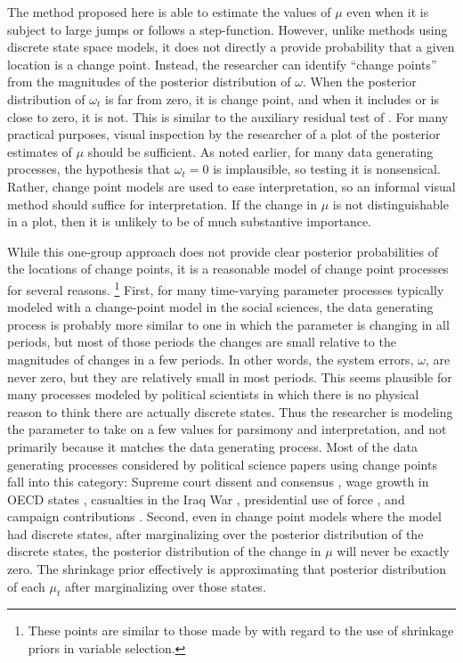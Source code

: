 The method proposed here is able to estimate the values of $\mu$ even when it is subject to large jumps or follows a step-function. 
However, unlike methods using discrete state space models, it does not directly a provide probability that a given location is a change point.
Instead, the researcher can identify ``change points'' from the magnitudes of the posterior distribution of $\omega$.
When the posterior distribution of $\omega_{t}$ is far from zero, it is change point, and when it includes or is close to zero, it is not.
This is similar to the auxiliary residual test of \textcite{DeJongPenzer1998}.
For many practical purposes, visual inspection by the researcher of a plot of the posterior estimates of $\mu$ should be sufficient.
As noted earlier, for many data generating processes, the hypothesis that $\omega_{t} = 0$ is implausible, so testing it is nonsensical.
Rather, change point models are used to ease interpretation, so an informal visual method should suffice for interpretation.
If the change in $\mu$ is not distinguishable in a plot, then it is unlikely to be of much substantive importance.

While this one-group approach does not provide clear posterior probabilities of the locations of change points, it is a reasonable model of change point processes for several reasons.%
\footnote{These points are similar to those made by \textcite[2-3]{PolsonScott2012} with regard to the use of shrinkage priors in variable selection.}
First, for many time-varying parameter processes typically modeled with a change-point model in the social sciences, the data generating process is probably more similar to one in which the parameter is changing in all periods, but most of those periods the changes are small relative to the magnitudes of changes in a few periods.
In other words, the system errors, $\omega$, are never zero, but they are relatively small in most periods.
This seems plausible for many processes modeled by political scientists in which there is no physical reason to think there are actually discrete states.
Thus the researcher is modeling the parameter to take on a few values for parsimony and interpretation, and not primarily because it matches the data generating process.
Most of the data generating processes considered by political science papers using change points fall into this category: Supreme court dissent and consensus \parencite{CalderiaZorn1998}, wage growth in OECD states \parencite{WesternKleykamp2004}, casualties in the Iraq War \parencite{Spirling2007a}, presidential use of force \parencite{Park2010}, and campaign contributions \parencite{Blackwell2012}.
Second, even in change point models where the model had discrete states, after marginalizing over the posterior distribution of the discrete states, the posterior distribution of the change in $\mu$ will never be exactly zero.
The shrinkage prior effectively is approximating that posterior distribution of each $\mu_{t}$ after marginalizing over those states.



